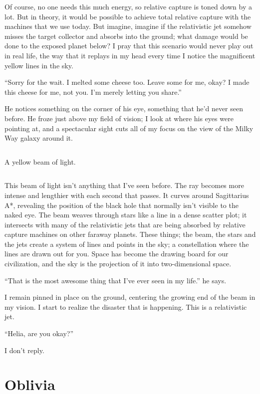 \documentclass{book}
\newcommand{\spacer}{\[\]}
\begin{document}
			Of course, no one needs this much energy, so relative capture is toned down by a lot.
			But in theory, it would be possible to achieve total relative capture with the machines
			that we use today. But imagine, imagine if the relativistic jet somehow misses the
			target collector and absorbs into the ground; what damage would be done to the exposed
			planet below? I pray that this scenario would never play out in real life, the way that
			it replays in my head every time I notice the magnificent yellow lines in the sky.

			``Sorry for the wait. I melted some cheese too. Leave some for me, okay? I made this
			cheese for me, not you. I'm merely letting you share.''

			He notices something on the corner of his eye, something that he'd never seen before.
			He froze just above my field of vision; I look at where his eyes were pointing at, and
			a spectacular sight cuts all of my focus on the view of the Milky Way galaxy around it.

			\spacer{}

			A yellow beam of light.

			\spacer{}

			This beam of light isn't anything that I've seen before. The ray becomes more intense
			and lengthier with each second that passes. It curves around Sagittarius A*,
			revealing the position of the black hole that normally isn't visible to the naked eye.
			The beam weaves through stars like a line in a dense scatter plot; it intersects with
			many of the relativistic jets that are being absorbed by relative capture machines on
			other faraway planets. These things; the beam, the stars and the jets create a system
			of lines and points in the sky; a constellation where the lines are drawn out for you.
			Space has become the drawing board for our civilization, and the sky is the projection
			of it into two-dimensional space.

			``That is the most awesome thing that I've ever seen in my life.'' he says.

			I remain pinned in place on the ground, centering the growing end of the beam in my
			vision. I start to realize the disaster that is happening. This is a relativistic jet.

			``Helia, are you okay?''

			I don't reply.



		\chapter{Oblivia}
\end{document}
